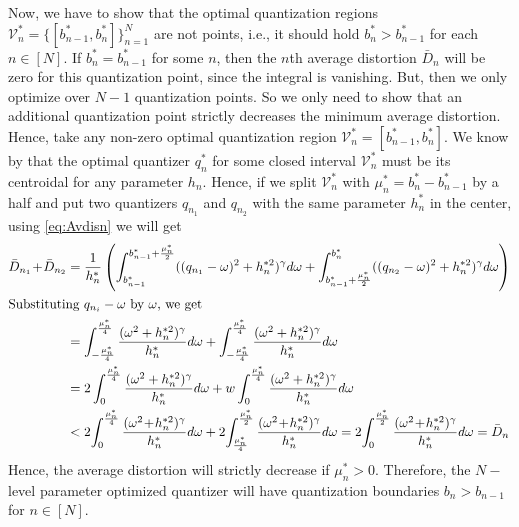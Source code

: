 \documentclass[12pt,onecolumn,journal,draftclsnofoot,letterpaper]{IEEEtran}
\newcommand{\Vor}{\ensuremath{\mathcal{V}}}         %
\newcommand{\Dis}{\ensuremath{D}}                    %
\newcommand{\AvDis}{\ensuremath{\bar{\Dis}}}         %
\begin{document}

  Now, we have to show that the optimal quantization regions $\Vor_n^*=\{[b^*_{n-1},b^*_n]\}_{n=1}^N$ are not points, i.e.,
  it should hold $b^*_n>b^*_{n-1}$ for each $n\in[N]$. If $b^*_n=b^*_{n-1}$ for some $n$, then the $n$th average distortion $\AvDis_n$
  will be zero for this quantization point, since the integral is vanishing. But, then we only optimize over $N-1$
  quantization points. So we only need to show that an additional quantization point strictly decreases the minimum
  average distortion.  Hence, take any non-zero optimal quantization region $\Vor_n^*=[b^*_{n-1},b^*_n]$. We know by
   that the optimal quantizer $q_n^*$ for some closed interval $\Vor_n^*$  must be its centroidal for
  any parameter $h_n$.  Hence, if we split  $\Vor_n^*$ with  $\mu_n^*=b^*_n-b^*_{n-1}$ by a half and put two quantizers
  $q_{n_1}$ and $q_{n_2}$ with the same parameter $h_n^*$ in the center, using \eqref{eq:Avdisn} we will get 
  \begin{align}
      \AvDis_{n_1}\!+\!\AvDis_{n_2}&=\frac{1}{h_n^*} 
     \left( \int_{b^*_{n-1}}^{b^*_{n-1}+\frac{\mu_n^*}{2}} ( (q_{n_1}-\ome)^2 + h_n^{*2})^{\gam}d\ome
     +\int_{b_{n-1}^*+\frac{\mu_n^*}{2}}^{b_n^*}((q_{n_2}-\ome)^2+h_n^{*2})^{\gam}d\ome\right)\notag\\
   \intertext{Substituting $q_{n_i}-\ome$ by $\ome$, we get} 
     & =  \int_{-\frac{\mu_n^*}{4}}^{\frac{\mu_n^*}{4}} \frac{(\ome^2+h_n^{*2})^{\gam}}{h_n^*}d\ome
     + \int_{-\frac{\mu_n^*}{4}}^{\frac{\mu_n^*}{4}} \frac{(\ome^2+h_n^{*2})^{\gam}}{h_n^*}d\ome\\
     & =  2\int_{0}^{\frac{\mu_n^*}{4}} \frac{(\ome^2+h_n^{*2})^{\gam}}{h_n^*}d\ome 
     + w\int_{0}^{\frac{\mu_n^*}{4}}    \frac{ (\ome^2+h_n^{*2})^{\gam}}{h_n^*}d\ome\\
     & <  2\!\int_{0}^{\frac{\mu_n^*}{4}} \frac{(\ome^2\!+\!h_n^{*2})^{\gam}}{h_n^*}d\ome
     + 2\!\int_{\frac{\mu_n^*}{4}}^{\frac{\mu_n^*}{2}} \frac{(\ome^2\!+\!h_n^{*2})^{\gam}}{h_n^*}d\ome
     = 2\!\int_0^{\frac{\mu_n^*}{2}} \frac{(\ome^2\!+\!h_n^{*2})^\gam}{h_n^*} d\ome=\AvDis_n\notag
  \end{align}
  Hence, the average distortion will strictly decrease if $\mu_n^*>0$. Therefore, the $N-$level parameter optimized
  quantizer will have
  quantization boundaries $b_n\!>\!b_{n\!-\!1}$ for $n\in[N]$.
\end{document}
